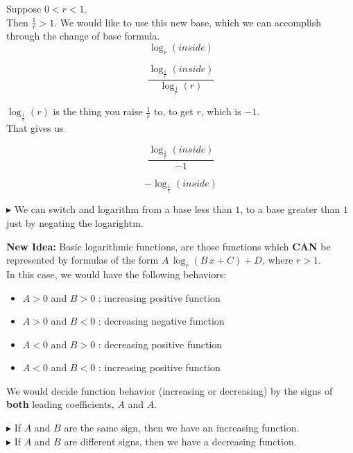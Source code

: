 \documentclass{ximera}
\begin{document}
Suppose $0 < r < 1$.\\

Then $\frac{1}{r} > 1$.  We would like to use this new base, which we can accomplish through the change of base formula.\\

\[
\log_r(inside)
\]


\[
\frac{\log_{\tfrac{1}{r}}(inside)}{\log_{\tfrac{1}{r}}(r)}
\]


$\log_{\tfrac{1}{r}}(r)$ is the thing you raise $\frac{1}{r}$ to, to get $r$, which is $-1$. \\


That gives us


\[
\frac{\log_{\tfrac{1}{r}}(inside)}{-1}
\]



\[
-\log_{\tfrac{1}{r}}(inside)
\]



\textbf{\textcolor{red!90!darkgray}{$\blacktriangleright$}} We can switch and logarithm from a base less than $1$, to a base greater than $1$ just by negating the logarightm.




\textbf{New Idea:} Basic logarithmic functions, are those functions which \textbf{\textcolor{red!80!black}{CAN}} be represented by formulas of the form $A \, \log_r(B \, x + C) + D$, where $r > 1$.  \\


In this case, we would have the following behaviors: \\


\begin{itemize}
\item $A > 0$ and $B > 0$ : increasing positive function
\item $A > 0$ and $B < 0$ : decreasing negative function  
\item $A < 0$ and $B > 0$ : decreasing positive function
\item $A < 0$ and $B < 0$ : increasing positive function 
\end{itemize}

We would decide function behavior (increasing or decreasing) by the signs of \textbf{both} leading coefficients, $A$ and $A$.

\textbf{\textcolor{red!90!darkgray}{$\blacktriangleright$}} If $A$ and $B$ are the same sign, then we have an increasing function. \\

\textbf{\textcolor{red!90!darkgray}{$\blacktriangleright$}} If $A$ and $B$ are different signs, then we have a decreasing function. \\
\end{document}
